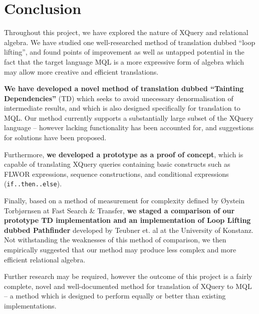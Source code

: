 \chapter{Conclusion}
\label{chapter:conclusion}
Throughout this project, we have explored the nature of XQuery and relational
algebra. We have studied one well-researched method of translation dubbed ``loop
lifting'', and found points of improvement as well as untapped potential in the
fact that the target language MQL is a more expressive form of algebra
which may allow more creative and efficient translations.

\textbf{We have developed a novel method of translation dubbed ``Tainting
Dependencies''} (TD) which seeks to avoid unecessary denormalisation of
intermediate results, and which is also designed specifically for translation
to MQL. Our method currently supports a substantially large subset of the XQuery
language -- however lacking functionality has been accounted for, and suggestions for
solutions have been proposed.

Furthermore, \textbf{we developed a prototype as a proof of concept}, which is
capable of translating XQuery queries containing basic constructs such as FLWOR
expressions, sequence constructions, and conditional expressions
(\texttt{if..then..else}).

Finally, based on a method of measurement for complexity defined by \O ystein
Torbj\o rnsen at Fast Search \& Transfer, \textbf{we staged a comparison of our prototype TD
implementation and an implementation of Loop Lifting dubbed Pathfinder}
developed by Teubner et. al at the University of Konstanz. Not withstanding the
weaknesses of this method of comparison, we then empirically suggested that
our method may produce less complex and more efficient relational algebra.

Further research may be required, however the outcome of this project is a
fairly complete, novel and well-documented method for translation of XQuery to
MQL -- a method which is designed to perform equally or better than existing
implementations.

% 
